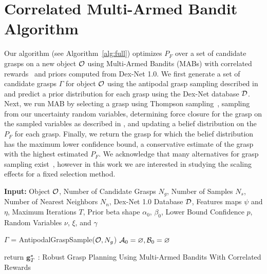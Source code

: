 \section{Correlated Multi-Armed Bandit Algorithm}
Our algorithm (see Algorithm~\ref{alg:full}) optimizes $P_F$ over a set of candidate grasps on a new object $\mathcal{O}$ using Multi-Armed Bandits (MABs) with correlated rewards~\cite{hoffman2013exploiting, pandey2007multi} and priors computed from Dex-Net 1.0.
We first generate a set of candidate grasps $\Gamma$ for object $\mathcal{O}$ using the antipodal grasp sampling described in  and predict a prior distribution for each grasp using the Dex-Net database $\mathcal{D}$.
Next, we run MAB by selecting a grasp using Thompson sampling~\cite{laskey2015bandits, oberlin2015autonomously}, sampling from our uncertainty random variables, determining force closure for the grasp on the sampled variables as described in , and updating a belief distribution on the $P_F$ for each grasp.
Finally, we return the grasp for which the belief distribution has the maximum lower confidence bound, a conservative estimate of the grasp with the highest estimated $P_F$.
We acknowledge that many alternatives for grasp sampling exist~\cite{kroemer2010combining, montesano2012active, oberlin2015autonomously}, however in this work we are interested in studying the scaling effects for a fixed selection method.

\begin{algorithm}
{\small
    \SetAlgoLined
    {\bf Input:} Object $\mathcal{O}$, Number of Candidate Grasps $N_g$, Number of Samples $N_s$, Number of Nearest Neighbors $N_n$, Dex-Net 1.0 Database $\mathcal{D}$, Features maps $\psi$ and $\eta$,  Maximum Iterations $T$, Prior beta shape $\alpha_0$, $\beta_0$, Lower Bound Confidence $p$, Random Variables $\nu$, $\xi$, and $\gamma$ \\
    
	$\Gamma$ = AntipodalGraspSample($\mathcal{O}, N_g$) \;
	$\mathcal{A}_0 = \varnothing, \mathcal{B}_0 = \varnothing$\;
	
	return $\mathbf{g}_T^*$\;
    : Robust Grasp Planning Using Multi-Armed Bandits With Correlated Rewards
    \label{alg:full}
}
\end{algorithm}

